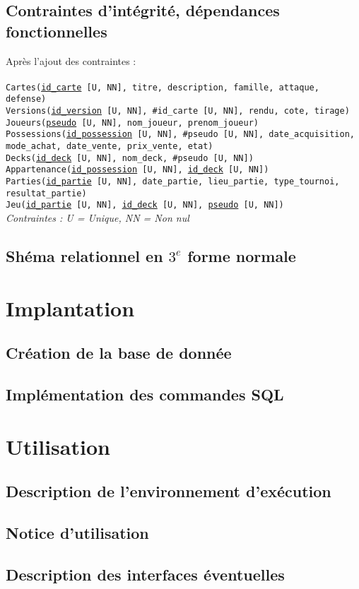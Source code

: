 \documentclass{article}
\begin{document}
\subsection{Contraintes d'intégrité, dépendances fonctionnelles}
Après l'ajout des contraintes : \\
\\
\texttt{Cartes(\underline{id\_carte} [U, NN], titre, description, famille, attaque, defense)} \\
\texttt{Versions(\underline{id\_version} [U, NN], \#id\_carte [U, NN], rendu, cote, tirage)} \\
\texttt{Joueurs(\underline{pseudo} [U, NN], nom\_joueur, prenom\_joueur)} \\
\texttt{Possessions(\underline{id\_possession} [U, NN], \#pseudo [U, NN], date\_acquisition, mode\_achat, date\_vente, prix\_vente, etat)} \\
\texttt{Decks(\underline{id\_deck} [U, NN], nom\_deck, \#pseudo [U, NN])} \\
\texttt{Appartenance(\underline{id\_possession} [U, NN], \underline{id\_deck} [U, NN])} \\
\texttt{Parties(\underline{id\_partie} [U, NN], date\_partie, lieu\_partie, type\_tournoi, resultat\_partie)} \\
\texttt{Jeu(\underline{id\_partie} [U, NN], \underline{id\_deck} [U, NN], \underline{pseudo} [U, NN])} \\

\textit{Contraintes : U = Unique, NN = Non nul}

\subsection{Shéma relationnel en $3^e$ forme normale}

\section{Implantation}
\subsection{Création de la base de donnée}
\subsection{Implémentation des commandes SQL}

\section{Utilisation}
\subsection{Description de l'environnement d'exécution}
\subsection{Notice d'utilisation}
\subsection{Description des interfaces éventuelles}
\end{document}
